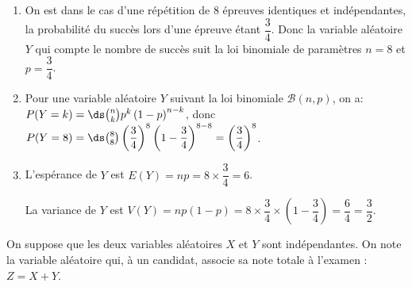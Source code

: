 \begin{enumerate}
\item
On est dans le cas d'une répétition de 8 épreuves identiques et indépendantes, la probabilité du succès lors d'une épreuve étant $\dfrac{3}{4}$. Donc la variable aléatoire $Y$ qui compte le nombre de succès suit la loi binomiale de paramètres $n=8$ et $p=\dfrac{3}{4}$.

\item 
Pour une variable aléatoire $Y$ suivant la loi binomiale $\mathcal{B}(n,p)$, on a:\\
$P(Y=k)=\ds\binom{n}{k} p^k \left (1-p\right )^{n-k}$, 
donc $P(Y=8)=\ds\binom{8}{8} \left (\dfrac{3}{4}\right )^{8}\left (1-\dfrac{3}{4}\right )^{8-8}
= \left (\dfrac{3}{4}\right )^8$.

\item L'espérance de $Y$ est $E(Y)= np = 8\times \dfrac{3}{4}= 6$.

La variance de $Y$ est $V(Y)= np(1 - p) = 8\times \dfrac{3}{4}\times \left (1 - \dfrac{3}{4}\right )=\dfrac{6}{4}= \dfrac{3}{2}$.
\end{enumerate}

\medskip


\medskip



On suppose que les deux variables aléatoires $X$ et $Y$ sont indépendantes. On note la variable aléatoire qui, à un candidat, associe sa note totale à l'examen : $Z = X + Y$.

